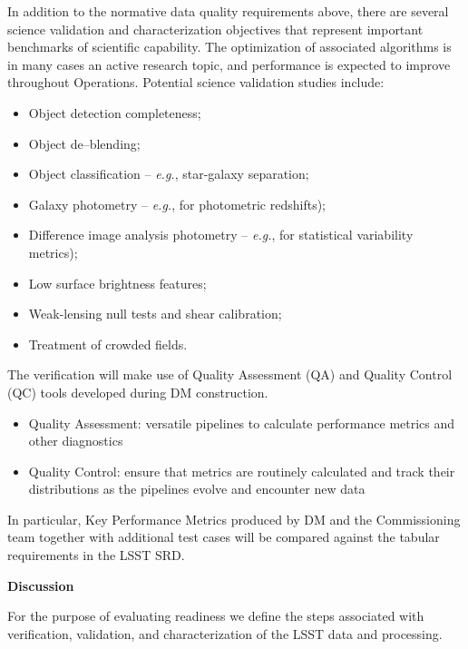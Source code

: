 In addition to the normative data quality requirements above, there are several science validation and characterization objectives that represent important benchmarks of scientific capability. The optimization of associated algorithms is in many cases an active research topic, and performance is expected to improve throughout Operations. Potential science validation studies include:

\begin{itemize}

	\item  Object detection completeness;
	\item Object de--blending;
	\item  Object classification -- {\it e.g.}, star-galaxy separation;
	\item  Galaxy photometry -- {\it e.g.}, for photometric redshifts);
	\item  Difference image analysis photometry -- {\it e.g.}, for statistical variability metrics);
	\item  Low surface brightness features;
	\item  Weak-lensing null tests and shear calibration;
	\item  Treatment of crowded fields.
	
\end{itemize}

The verification will make use of Quality Assessment (QA) and Quality Control (QC) tools developed during DM construction.

\begin{itemize}

	\item Quality Assessment: versatile pipelines to calculate performance metrics and other diagnostics
	\item Quality Control: ensure that metrics are routinely calculated and track their distributions as the pipelines evolve and encounter new data
	
\end{itemize}

In particular, Key Performance Metrics produced by DM and the Commissioning team together with additional test cases will be compared against the tabular requirements in the LSST SRD. 

\textbf{Discussion}

For the purpose of evaluating readiness we define the steps associated with verification, validation, and characterization of the LSST data and processing.

